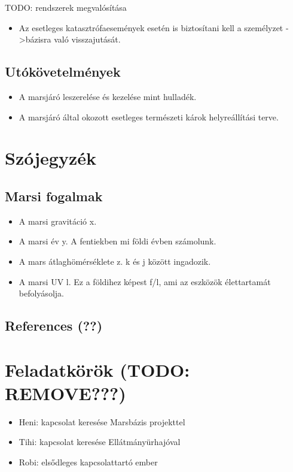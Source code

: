 \documentclass[12pt]{report}
\begin{document}
TODO: rendszerek megvalósítása







\begin{itemize}
  \item Az esetleges katasztrófaesemények esetén is biztosítani kell a személyzet ->bázisra való visszajutását.
\end{itemize}
\section{Utókövetelmények}
\begin{itemize}
  \item A marsjáró leszerelése és kezelése mint hulladék.
  \item A marsjáró által okozott esetleges természeti károk helyreállítási terve.
\end{itemize}

\chapter{Szójegyzék}
\section{Marsi fogalmak}
\begin{itemize}
  \item A marsi gravitáció x.
  \item A marsi év y. A fentiekben mi földi évben számolunk.
  \item A mars átlaghömérséklete z. k és j között ingadozik.
  \item A marsi UV l. Ez a földihez képest f/l, ami az eszközök élettartamát befolyásolja.
\end{itemize}

\section{References (??)}





\chapter*{Feladatkörök (TODO: REMOVE???)}
\begin{itemize}
    \item Heni: kapcsolat keresése Marsbázis projekttel
    \item Tihi: kapcsolat keresése Ellátmányürhajóval
    \item Robi: elsődleges kapcsolattartó ember
    
\end{itemize}
\end{document}
